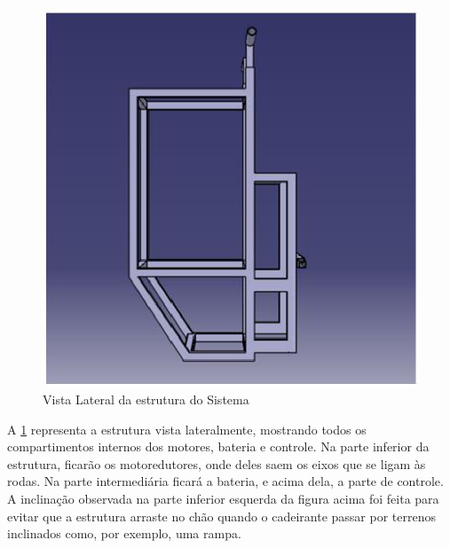 \begin{figure}[!htb]
\centering
\includegraphics[keepaspectratio=true,scale=0.7]{figuras/resultados/vista_lateral_estrutura}
\caption{Vista Lateral da estrutura do Sistema}
\label{fig:vista_lateral_estrutura}
\end{figure}

A \ref{fig:vista_lateral_estrutura} representa a estrutura vista lateralmente, mostrando todos os compartimentos internos dos motores, bateria e controle. Na parte inferior da estrutura, ficarão os motoredutores, onde deles saem os eixos que se ligam às rodas. Na parte intermediária ficará a bateria, e acima dela, a parte de controle. A inclinação observada na parte inferior esquerda da figura acima foi feita para evitar que a estrutura arraste no chão quando o cadeirante passar por terrenos inclinados como, por exemplo, uma rampa.

